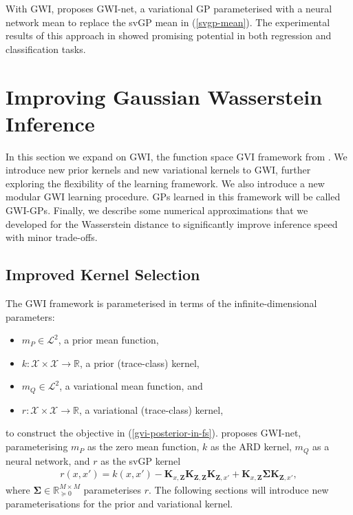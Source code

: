 \documentclass{article}
\numberwithin{equation}{section}
\begin{document}
With GWI, \cite{wild2022generalized} proposes GWI-net, a variational GP parameterised with a neural network mean to replace the svGP mean in (\ref{svgp-mean}).
The experimental results of this approach in \cite{wild2022generalized} showed promising potential in both regression and classification tasks.

\newpage

\section{Improving Gaussian Wasserstein Inference}\label{section:improving-gwi}
In this section we expand on GWI, the function space GVI framework from \cite{wild2022generalized}.
We introduce new prior kernels and new variational kernels to GWI, further exploring the flexibility of the learning framework.
We also introduce a new modular GWI learning procedure.
GPs learned in this framework will be called GWI-GPs.
Finally, we describe some numerical approximations that we developed for the Wasserstein distance to significantly improve inference speed with minor trade-offs.

\subsection{Improved Kernel Selection}
The GWI framework is parameterised in terms of the infinite-dimensional parameters:
\begin{itemize}
    \setlength\itemsep{0em}
    \item $m_P \in \mathcal{L}^2$, a prior mean function,
    \item $k: \mathcal{X} \times \mathcal{X} \rightarrow \mathbb{R}$, a prior (trace-class) kernel,
    \item $m_Q \in \mathcal{L}^2$, a variational mean function, and
    \item $r: \mathcal{X} \times \mathcal{X} \rightarrow \mathbb{R}$, a variational (trace-class) kernel,
\end{itemize}
to construct the objective in (\ref{gvi-posterior-in-fs}). \cite{wild2022generalized} proposes GWI-net, parameterising $m_P$ as the zero mean function, $k$ as the ARD kernel, $m_Q$ as a neural network, and $r$ as the svGP kernel
\begin{align}
    r(x, x') = k(x, x') - \mathbf{K}_{x, \mathbf{Z}} \mathbf{K}_{\mathbf{Z}, \mathbf{Z}} \mathbf{K}_{\mathbf{Z}, x'} + \mathbf{K}_{x, \mathbf{Z}} \mathbf{\Sigma} \mathbf{K}_{\mathbf{Z}, x'},
    \label{gwi-svgp-kernel}
\end{align}
where $\mathbf{\Sigma} \in \mathbb{R}^{M \times M}_{\succcurlyeq 0}$ parameterises $r$. The following sections will introduce new parameterisations for the prior and variational kernel.
\end{document}
